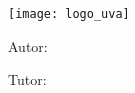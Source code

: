 \documentclass{subfiles}
\begin{document}
  \newgeometry{}

  \begin{titlepage}

    \centering
    \texttt{[image: logo\_uva]}\par\vspace{1cm}

    {\scshape\LARGE \theschool \par}
    \vspace{0.5cm}

    {\scshape\Large \thesubject\par}
    \vspace{1.25cm}

    {\scshape\Large \thegrade\par}
    \vspace{3cm}

    {\huge\bfseries \thetitle\par}
    \vspace{2cm}


    {\Large\hfill Autor: \par}
    {\Large\hfill\bfseries \theauthor\par}
    \vspace{1cm}

    {\Large\hfill Tutor: \par}
    {\Large\hfill\bfseries \thesupervisor\par}
    \vfill

  \end{titlepage}

  \restoregeometry
  \setcounter{page}{1}
\end{document}
